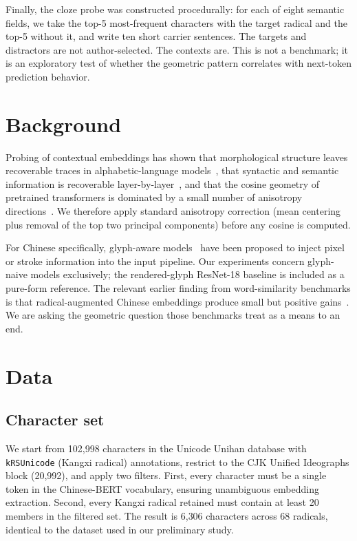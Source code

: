 \documentclass[11pt,a4paper,twocolumn]{article}
\begin{document}
Finally, the cloze probe was constructed procedurally: for each of
eight semantic fields, we take the top-5 most-frequent characters with
the target radical and the top-5 without it, and write ten short
carrier sentences. The targets and distractors are not author-selected.
The contexts are. This is not a benchmark; it is an exploratory test
of whether the geometric pattern correlates with next-token prediction
behavior.

\section{Background}

Probing of contextual embeddings has shown that morphological structure
leaves recoverable traces in alphabetic-language
models~\cite{Hofmann2021,Durrani2019}, that syntactic and semantic
information is recoverable layer-by-layer~\cite{HewittManning2019,
Tenney2019}, and that the cosine geometry of pretrained transformers is
dominated by a small number of anisotropy
directions~\cite{MuViswanath2018,Ethayarajh2019}. We therefore apply
standard anisotropy correction (mean centering plus removal of the top
two principal components) before any cosine is computed.

For Chinese specifically, glyph-aware
models~\cite{SunChineseBERT2021,Meng2019Glyce} have been proposed to
inject pixel or stroke information into the input pipeline. Our
experiments concern glyph-naive models exclusively; the rendered-glyph
ResNet-18 baseline is included as a pure-form reference. The relevant
earlier finding from word-similarity benchmarks is that
radical-augmented Chinese embeddings produce small but positive
gains~\cite{Xu2016,Yu2017}. We are asking the geometric question those
benchmarks treat as a means to an end.

\section{Data}

\subsection{Character set}
We start from 102{,}998 characters in the Unicode Unihan database with
\texttt{kRSUnicode} (Kangxi radical) annotations, restrict to the CJK
Unified Ideographs block (20{,}992), and apply two filters. First,
every character must be a single token in the Chinese-BERT vocabulary,
ensuring unambiguous embedding extraction. Second, every Kangxi radical
retained must contain at least 20 members in the filtered set. The
result is 6{,}306 characters across 68 radicals, identical to the
dataset used in our preliminary study.
\end{document}
